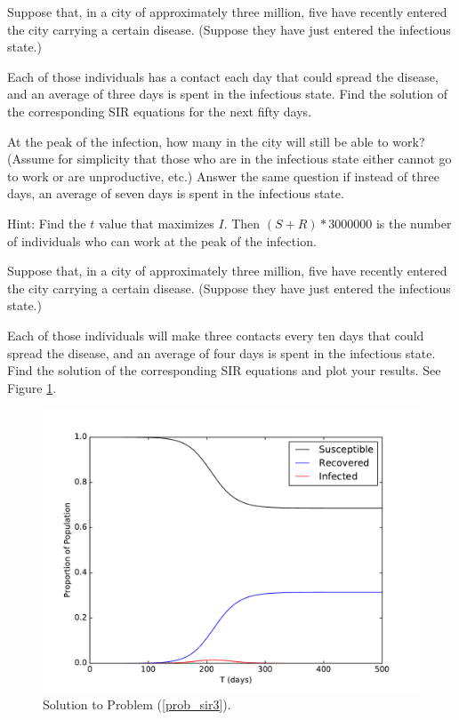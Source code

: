 \begin{problem}
Suppose that, in a city of approximately three million, five have recently entered the city carrying a certain disease.
(Suppose they have just entered the infectious state.)

Each of those individuals has a contact each day that could spread the disease, and an average of three days is spent in the infectious state.
Find the solution of the corresponding SIR equations for the next fifty days.


At the peak of the infection, how many in the city will still be able to work? (Assume for simplicity that those who are in the infectious state either cannot go to work or are unproductive, etc.)
Answer the same question if instead of three days, an average of seven days is spent in the infectious state.

Hint: Find the $t$ value that maximizes $I$. Then $(S + R)*3000000$ is the number of individuals who can work at the peak of the infection. 
\end{problem}


\begin{problem}
Suppose that, in a city of approximately three million, five have recently entered the city carrying a certain disease.
(Suppose they have just entered the infectious state.)

Each of those individuals will make three contacts every ten days that could spread the disease, and an average of four days is spent in the infectious state.
Find the solution of the corresponding SIR equations and plot your results. See Figure \ref{sir:exercise3}.
\label{prob_sir3}
\end{problem}


\begin{figure}[ht]
\centering
\includegraphics[width=\textwidth]{exercise3.pdf}
\caption{Solution to Problem (\ref{prob_sir3}).}
\label{sir:exercise3}
\end{figure}



